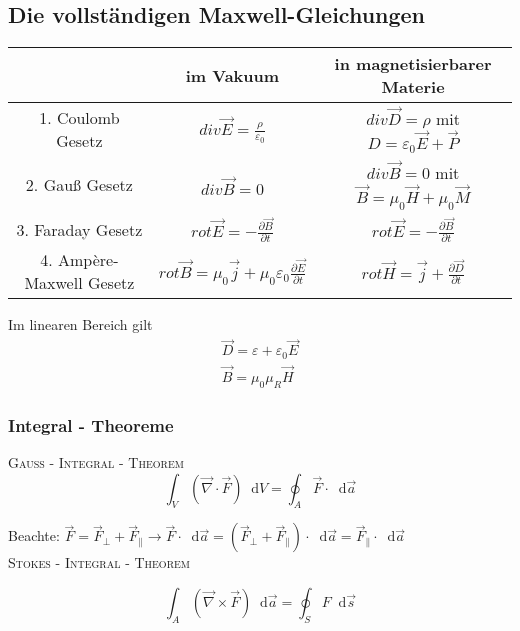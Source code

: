 \documentclass[a4paper,12pt]{report}
\newcommand*\diff{\mathop{}\!\mathrm{d}}
\begin{document}
\subsection{Die vollständigen Maxwell-Gleichungen}
\begin{center}
\begin{tabular}{c|c|c}
& im Vakuum & in magnetisierbarer Materie \\
\hline 
1. Coulomb Gesetz & $div\vec{E} = \frac{\rho}{\varepsilon_0}$ & $div\vec{D} = \rho$ mit $D = \varepsilon_0\vec{E} + \vec{P}$ \\
\hline
2. Gauß Gesetz & $div\vec{B} = 0$ & $div\vec{B} = 0$ mit $\vec{B} = \mu_0 \vec{H} + \mu_0 \vec{M}$ \\
\hline 
3. Faraday Gesetz & $rot\vec{E} = - \frac{\partial \vec{B}}{\partial t}$ & $rot\vec{E} = - \frac{\partial \vec{B}}{\partial t}$ \\
\hline
4. Ampère-Maxwell Gesetz & $rot\vec{B} = \mu_0 \vec{j} + \mu_0 \varepsilon_0 \frac{\partial \vec{E}}{\partial t}$ & $rot\vec{H} = \vec{j} + \frac{\partial \vec{D}}{\partial t}$
\end{tabular}
\end{center}





Im linearen Bereich gilt 
\begin{align}
\vec{D} = \varepsilon + \varepsilon_0\vec{E} \\
\vec{B} = \mu_0\mu_R\vec{H}
\end{align}

\subsubsection{Integral - Theoreme}

\textsc{Gauß - Integral - Theorem} \\

 \begin{equation}
\int_V (\vec{\nabla} \cdot \vec{F} ) \diff V = \oint_A \vec{F} \cdot \diff \vec{a}
\end{equation}

Beachte: $\vec{F} = \vec{F}_\perp + \vec{F}_\parallel \rightarrow \vec{F} \cdot \diff \vec{a} = (\vec{F}_\perp + \vec{F}_\parallel) \cdot \diff \vec{a} = \vec{F}_\parallel \cdot \diff \vec{a} $ \\

\textsc{Stokes - Integral - Theorem}

\begin{equation}
\int_A (\vec{\nabla} \times \vec{F}) \diff \vec{a} = \oint_S F \diff \vec{s}
\end{equation}
\end{document}
